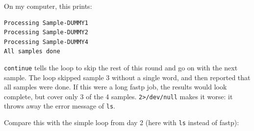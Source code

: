 \documentclass[
  letterpaper,
  DIV=11,
  numbers=noendperiod]{scrreprt}
\newenvironment{Shaded}{}{}
\newcommand{\BuiltInTok}[1]{\textcolor[rgb]{0.84,0.23,0.29}{#1}}
\newcommand{\ControlFlowTok}[1]{\textcolor[rgb]{0.84,0.23,0.29}{#1}}
\newcommand{\DecValTok}[1]{\textcolor[rgb]{0.00,0.36,0.77}{#1}}
\newcommand{\FunctionTok}[1]{\textcolor[rgb]{0.44,0.26,0.76}{#1}}
\newcommand{\KeywordTok}[1]{\textcolor[rgb]{0.84,0.23,0.29}{#1}}
\newcommand{\NormalTok}[1]{\textcolor[rgb]{0.14,0.16,0.18}{#1}}
\newcommand{\OperatorTok}[1]{\textcolor[rgb]{0.14,0.16,0.18}{#1}}
\newcommand{\OtherTok}[1]{\textcolor[rgb]{0.44,0.26,0.76}{#1}}
\newcommand{\PreprocessorTok}[1]{\textcolor[rgb]{0.84,0.23,0.29}{#1}}
\newcommand{\StringTok}[1]{\textcolor[rgb]{0.01,0.18,0.38}{#1}}
\newcommand{\VariableTok}[1]{\textcolor[rgb]{0.89,0.38,0.04}{#1}}
\begin{document}
\begin{Shaded}
\end{Shaded}

On my computer, this prints:

\begin{verbatim}
Processing Sample-DUMMY1
Processing Sample-DUMMY2
Processing Sample-DUMMY4
All samples done
\end{verbatim}

\texttt{continue} tells the loop to skip the rest of this round and go
on with the next sample. The loop skipped sample 3 without a single
word, and then reported that all samples were done. If this were a long
fastp job, the results would look complete, but cover only 3 of the 4
samples. \texttt{2\textgreater{}/dev/null} makes it worse: it throws
away the error message of \texttt{ls}.

Compare this with the simple loop from day 2 (here with \texttt{ls}
instead of fastp):

\begin{Shaded}
\end{Shaded}
\end{document}
